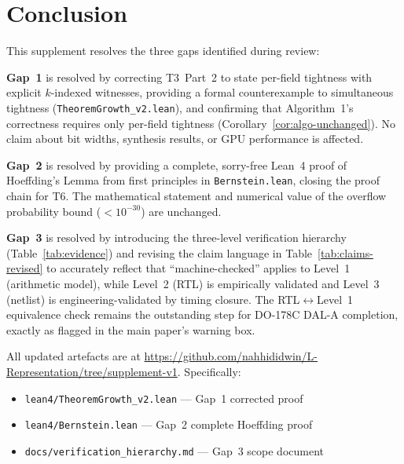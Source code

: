 \documentclass[11pt,a4paper]{article}
\theoremstyle{definition}
\theoremstyle{plain}
\theoremstyle{remark}
\begin{document}
\section{Conclusion}
\label{sec:conclusion-supp}

This supplement resolves the three gaps identified during review:

\textbf{Gap~1} is resolved by correcting T3~Part~2 to state per-field
tightness with explicit $k$-indexed witnesses, providing a formal
counterexample to simultaneous tightness
(\texttt{TheoremGrowth\_v2.lean}),
and confirming that Algorithm~1's correctness requires only per-field
tightness (Corollary~\ref{cor:algo-unchanged}).
No claim about bit widths, synthesis results, or GPU performance
is affected.

\textbf{Gap~2} is resolved by providing a complete,
sorry-free Lean~4 proof of Hoeffding's Lemma from first principles
in \texttt{Bernstein.lean}, closing the proof chain for T6.
The mathematical statement and numerical value of the overflow
probability bound ($< 10^{-30}$) are unchanged.

\textbf{Gap~3} is resolved by introducing the three-level verification
hierarchy (Table~\ref{tab:evidence}) and revising the claim language
in Table~\ref{tab:claims-revised} to accurately reflect that
``machine-checked'' applies to Level~1 (arithmetic model), while
Level~2 (RTL) is empirically validated and Level~3 (netlist) is
engineering-validated by timing closure.
The RTL$\leftrightarrow$Level~1 equivalence check remains the
outstanding step for DO-178C DAL-A completion, exactly as flagged
in the main paper's warning box.

All updated artefacts are at
\url{https://github.com/nahhididwin/L-Representation/tree/supplement-v1}.
Specifically:
\begin{itemize}
  \item \texttt{lean4/TheoremGrowth\_v2.lean} — Gap~1 corrected proof
  \item \texttt{lean4/Bernstein.lean} — Gap~2 complete Hoeffding proof
  \item \texttt{docs/verification\_hierarchy.md} — Gap~3 scope document
\end{itemize}
\end{document}

